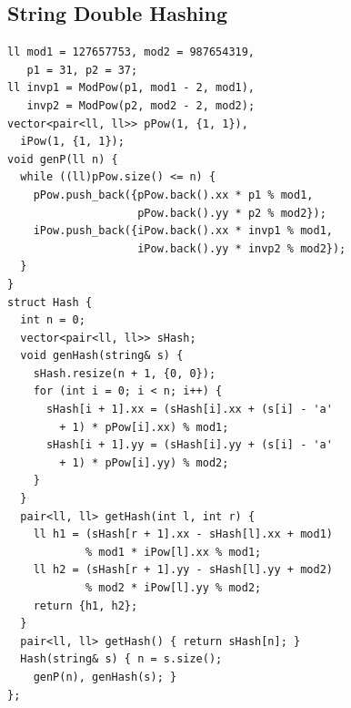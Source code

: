 \subsection{String Double Hashing}
\begin{verbatim}
ll mod1 = 127657753, mod2 = 987654319,
   p1 = 31, p2 = 37;
ll invp1 = ModPow(p1, mod1 - 2, mod1),
   invp2 = ModPow(p2, mod2 - 2, mod2);
vector<pair<ll, ll>> pPow(1, {1, 1}),
  iPow(1, {1, 1});
void genP(ll n) {
  while ((ll)pPow.size() <= n) {
    pPow.push_back({pPow.back().xx * p1 % mod1,
                    pPow.back().yy * p2 % mod2});
    iPow.push_back({iPow.back().xx * invp1 % mod1,
                    iPow.back().yy * invp2 % mod2});
  }
}
struct Hash {
  int n = 0;
  vector<pair<ll, ll>> sHash;
  void genHash(string& s) {
    sHash.resize(n + 1, {0, 0});
    for (int i = 0; i < n; i++) {
      sHash[i + 1].xx = (sHash[i].xx + (s[i] - 'a'
        + 1) * pPow[i].xx) % mod1;
      sHash[i + 1].yy = (sHash[i].yy + (s[i] - 'a'
        + 1) * pPow[i].yy) % mod2;
    }
  }
  pair<ll, ll> getHash(int l, int r) {
    ll h1 = (sHash[r + 1].xx - sHash[l].xx + mod1)
            % mod1 * iPow[l].xx % mod1;
    ll h2 = (sHash[r + 1].yy - sHash[l].yy + mod2)
            % mod2 * iPow[l].yy % mod2;
    return {h1, h2};
  }
  pair<ll, ll> getHash() { return sHash[n]; }
  Hash(string& s) { n = s.size();
    genP(n), genHash(s); }
};
\end{verbatim}
